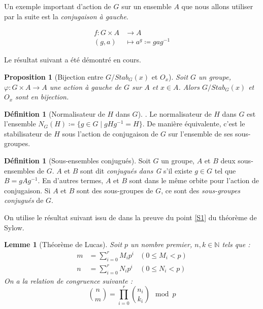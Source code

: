 \documentclass{article}
\theoremstyle{definition}
\newtheorem{definition}[subsubsection]{Définition}
\theoremstyle{plain}
\newtheorem{proposition}[subsubsection]{Proposition}
\theoremstyle{plain}
\theoremstyle{plain}
\newtheorem{lemma}[subsubsection]{Lemme}
\theoremstyle{plain}
\theoremstyle{definition}
\theoremstyle{plain}
\theoremstyle{plain}
\begin{document}
Un exemple important d'action de \( G \) sur un ensemble \( A \) que nous allons utiliser par la suite est la \textit{conjugaison à gauche}.


\begin{align*}
	f : G \times A &\to A \\
	(g,a) &\mapsto a^{g} \coloneq gag^{-1}
\end{align*}

Le résultat suivant a été démontré en cours.  
\begin{proposition}[Bijection entre \ensuremath{G/Stab_G(x)} et \ensuremath{O_x}]\label{prop:bij}
	Soit \( G \) un groupe, \( \varphi : G \times A \rightarrow A \) une action à gauche de \( G \) sur \( A \) et \( x \in A \). Alors \( G/Stab_G(x) \) et \( O_x \) sont en bijection.
\end{proposition}

\begin{definition}[Normalisateur de \ensuremath{H} dans \ensuremath{G}]\cite[p.~217]{chen2024napkin}.
	Le normalisateur de \( H \) dans \( G \) est l'ensemble 
	\( N_{G}({H}) \coloneq \{ g \in G \mid gHg^{-1} = H \} \).
	De manière équivalente, c'est le stabilisateur de \( H \) sous l'action de conjugaison de \( G \) sur l'ensemble de ses sous-groupes.
\end{definition}

\begin{definition}[Sous-ensembles conjugués]\cite[p. ~123]{dummit2003abstract} 
	Soit \( G \) un groupe, \( A \) et \( B \) deux sous-ensembles de \( G \). 
	\( A \) et \( B \) sont dit 
	\textit{conjugués dans G} s'il existe \( g \in G \) tel que \( B = gAg^{-1} \).
	En d'autres termes, \( A \) et \( B \) sont dans le même orbite pour l'action de conjugaison. Si \( A \) et \( B \) sont des sous-groupes de \( G \), ce sont des \textit{sous-groupes conjugués} de \( G \).
\end{definition}

On utilise le résultat suivant issu de \cite{fine1947binomial} dans la preuve du point \ref{S1} du théorème de Sylow.

\begin{lemma}[Théorème de Lucas]\label{thm:lucas}
	Soit \( p \) un nombre premier, \( n,k \in \mathbb{N} \) tels que :
	\begin{align*}
		m &= \sum_{i=0}^{r} M_{i}p^{i} &(0 \leq M_i < p)\\
		n &= \sum_{i=0}^{r} N_{i}p^{i} &(0 \leq N_i < p)
	\end{align*}
	On a la relation de congruence suivante :
	\begin{equation*}
		\binom{n}{m} = \prod_{i=0}^{r} \binom{n_i}{k_i} \mod p 
	\end{equation*}
\end{lemma}
\end{document}
